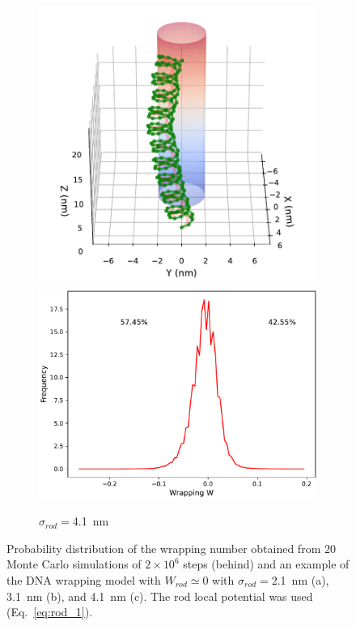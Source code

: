 \documentclass[a4paper,10pt]{article}
\begin{document}
\begin{figure}[htbp]
\begin{subfigure}{.3\textwidth}
\includegraphics[width=\textwidth]{r1_C_2000000_7.pdf}
\includegraphics[width=\textwidth]{r1_C_wr_pr.pdf}
\caption{$\sigma_{rod}=$\SI{4.1}{\nm}}
\label{fig:r1_c}
\end{subfigure}
\caption{Probability distribution of the wrapping number obtained from $20$ Monte Carlo simulations of $2\times 10^6$ steps (behind) and an example of the DNA wrapping model with $W_{rod}\simeq 0$ with $\sigma_{rod}=$\SI{2.1}{\nm} (a), \SI{3.1}{\nm} (b), and \SI{4.1}{\nm} (c). The rod local potential was used (Eq.~\ref{eq:rod_1}).}
\label{fig:r1}
\end{figure}
\end{document}
